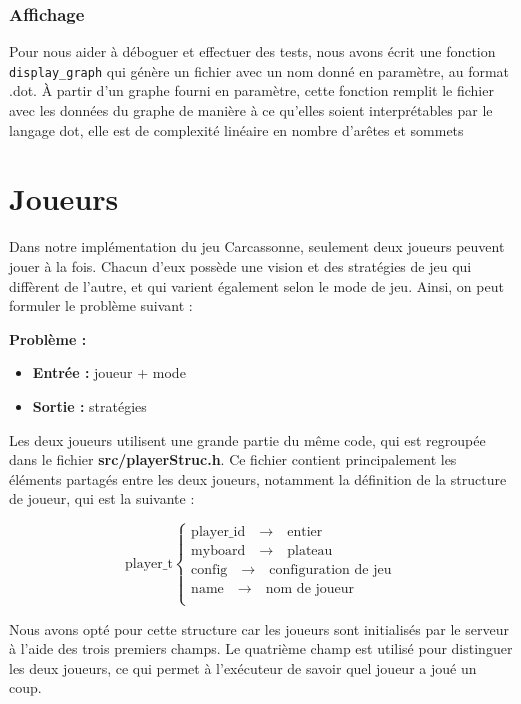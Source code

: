 \subsubsection{Affichage}

Pour nous aider à déboguer et effectuer des tests, nous avons écrit une fonction \texttt{display\_graph} qui génère un fichier avec un nom donné en paramètre, au format .dot. À partir d'un graphe fourni en paramètre, cette fonction remplit le fichier avec les données du graphe de manière à ce qu'elles soient interprétables par le langage dot, elle est de complexité linéaire en nombre d'arêtes et sommets




\section{Joueurs}
Dans notre implémentation du jeu Carcassonne, seulement deux joueurs peuvent jouer à la fois. Chacun d'eux possède une vision et des stratégies de jeu qui diffèrent de l'autre, et qui varient également selon le mode de jeu. Ainsi, on peut formuler le problème suivant :

\textbf{Problème :}
\begin{itemize}
\item \textbf{Entrée :} joueur + mode
\item \textbf{Sortie :} stratégies
\end{itemize}
Les deux joueurs utilisent une grande partie du même code, qui est regroupée dans le fichier \textbf{src/playerStruc.h}. Ce fichier contient principalement les éléments partagés entre les deux joueurs, notamment la définition de la structure de joueur, qui est la suivante :


\[
\text{player\_t} \left\{
\begin{array}{l}
\text{player\_id} \quad \rightarrow \quad \text{entier}\\
\text{myboard} \quad \rightarrow \quad \text{plateau}\\
\text{config} \quad \rightarrow \quad \text{configuration de jeu}\\
\text{name} \quad \rightarrow \quad \text{nom de joueur}\\ 
\end{array}
\right.
\]

Nous avons opté pour cette structure car les joueurs sont initialisés par le serveur à l'aide des trois premiers champs. Le quatrième champ est utilisé pour distinguer les deux joueurs, ce qui permet à l'exécuteur de savoir quel joueur a joué un coup.\\

